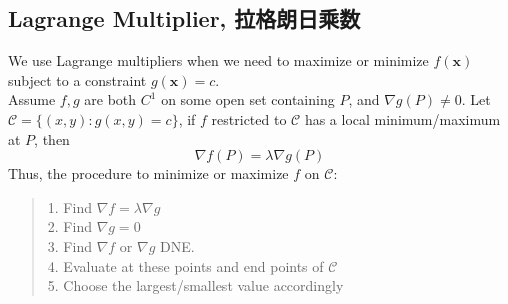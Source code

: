 \subsection{Lagrange Multiplier, 拉格朗日乘数}
We use Lagrange multipliers when we need to maximize or minimize $f(\textbf{x})$ subject to a constraint $g(\textbf{x}) = c$. \\
Assume $f, g$ are both $C^1$ on some open set containing $P$, and $\nabla g (P) \ne 0$. Let $\mathscr{C} = \{(x, y): g(x, y) = c\}$, if $f$ restricted to $\mathscr{C}$ has a local minimum/maximum at $P$, then 
$$\nabla f(P) = \lambda \nabla g(P)$$
Thus, the procedure to minimize or maximize $f$ on $\mathscr{C}$:
\begin{quote}
    1. Find $\nabla f = \lambda \nabla g$ \\
    2. Find $\nabla g = 0$ \\
    3. Find $\nabla f$ or $\nabla g$ DNE. \\
    4. Evaluate at these points and end points of $\mathscr{C}$ \\
    5. Choose the largest/smallest value accordingly
\end{quote}

\newpage